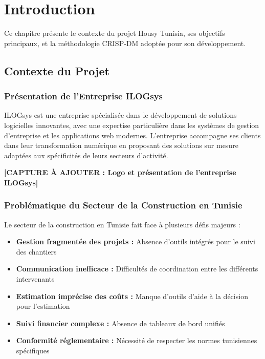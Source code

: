
\chapter{Introduction}

\begin{objectivebox}
Ce chapitre présente le contexte du projet Housy Tunisia, ses objectifs principaux, et la méthodologie CRISP-DM adoptée pour son développement.
\end{objectivebox}

\section{Contexte du Projet}

\subsection{Présentation de l'Entreprise ILOGsys}

ILOGsys est une entreprise spécialisée dans le développement de solutions logicielles innovantes, avec une expertise particulière dans les systèmes de gestion d'entreprise et les applications web modernes. L'entreprise accompagne ses clients dans leur transformation numérique en proposant des solutions sur mesure adaptées aux spécificités de leurs secteurs d'activité.

\textbf{[CAPTURE À AJOUTER : Logo et présentation de l'entreprise ILOGsys]}

\subsection{Problématique du Secteur de la Construction en Tunisie}

Le secteur de la construction en Tunisie fait face à plusieurs défis majeurs :

\begin{itemize}
    \item \textbf{Gestion fragmentée des projets :} Absence d'outils intégrés pour le suivi des chantiers
    \item \textbf{Communication inefficace :} Difficultés de coordination entre les différents intervenants
    \item \textbf{Estimation imprécise des coûts :} Manque d'outils d'aide à la décision pour l'estimation
    \item \textbf{Suivi financier complexe :} Absence de tableaux de bord unifiés
    \item \textbf{Conformité réglementaire :} Nécessité de respecter les normes tunisiennes spécifiques
\end{itemize}


